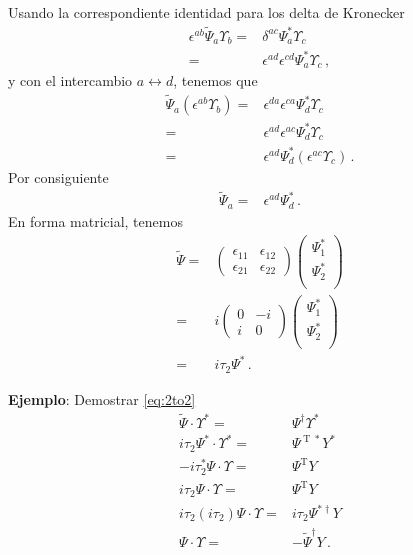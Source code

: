 \begin{frame}
Usando la correspondiente identidad para los delta de Kronecker
\begin{align}
   \epsilon^{ab}\widetilde{\Psi}_{a} \Upsilon_{b} =&\delta^{ac}\Psi_a^{*}\Upsilon_c \nonumber\\
                                     =&\epsilon^{ad}\epsilon^{cd}\Psi_a^{*}\Upsilon_c \,,
 \end{align}
y con el intercambio $a\leftrightarrow d$, tenemos que
\begin{align}
  \widetilde{\Psi}_{a} \left( \epsilon^{ab}\Upsilon_{b}\right)=&\epsilon^{da}\epsilon^{ca}\Psi_d^{*}\Upsilon_c \nonumber\\
=&\epsilon^{ad}\epsilon^{ac}\Psi_d^{*}\Upsilon_c \nonumber\\
=&\epsilon^{ad}\Psi_d^{*}\left( \epsilon^{ac}\Upsilon_c \right)\,.
\end{align}
Por consiguiente
\begin{align}
\widetilde{\Psi}_a=& \epsilon^{ad}\Psi_d^{*} \,.
\end{align}
En forma matricial, tenemos
\begin{align}
     \widetilde{\Psi}=&\begin{pmatrix} 
                  \epsilon_{11} & \epsilon_{12}\\
                 \epsilon_{21} & \epsilon_{22}
               \end{pmatrix}
               \begin{pmatrix}
                 \Psi_1^{*}\\
                 \Psi_2^{*}\\
               \end{pmatrix}\nonumber\\
               =&i\begin{pmatrix}
                 0 & -i\\
                 i & 0
               \end{pmatrix}
               \begin{pmatrix}
                 \Psi_1^{*}\\
                 \Psi_2^{*}\\
               \end{pmatrix}\nonumber\\
             =&i \tau_2 \Psi^{*}\,.
\end{align}

\textbf{Ejemplo}: Demostrar \eqref{eq:2to2}
\begin{align}
  \widetilde{\Psi}\cdot \Upsilon^*=& \Psi^{\dagger} \Upsilon^* \nonumber\\
  i \tau_2 \Psi^*\cdot \Upsilon^* =&\Psi^{\operatorname{T}*} Y^* \nonumber\\
  -i \tau_2^* \Psi \cdot \Upsilon= & \Psi^{\operatorname{T}} Y \nonumber\\
  i \tau_2 \Psi \cdot \Upsilon=&  \Psi^{\operatorname{T}} Y \nonumber\\
  i \tau_2( i \tau_2) \Psi \cdot \Upsilon=& i \tau_2 \Psi^{*\dagger} Y \nonumber\\
   \Psi \cdot \Upsilon=& - \widetilde{\Psi}^{\dagger} Y \,.
\end{align}



\end{frame}
